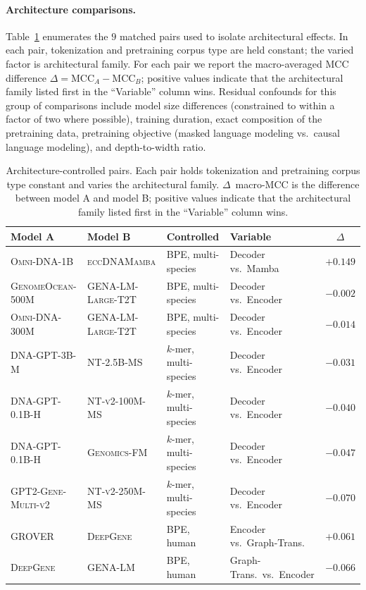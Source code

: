 \documentclass{llmxive}
\begin{document}
\paragraph{Architecture comparisons.}
Table~\ref{tab:pairs_arch} enumerates the $9$ matched pairs used to
isolate architectural effects. In each pair, tokenization and
pretraining corpus type are held constant; the varied factor is
architectural family. For each pair we report the macro-averaged MCC
difference $\Delta = \text{MCC}_A - \text{MCC}_B$; positive values
indicate that the architectural family listed first in the ``Variable''
column wins. Residual confounds for this group of comparisons include
model size differences (constrained to within a factor of two where
possible), training duration, exact composition of the pretraining
data, pretraining objective (masked language modeling vs.\ causal
language modeling), and depth-to-width ratio.


\begin{table}[!htbp]
\centering
\small
\begin{tabular}{@{}llllc@{}}
\toprule
\textbf{Model A} & \textbf{Model B} & \textbf{Controlled} & \textbf{Variable} & \textbf{$\Delta$} \\
\midrule
\textsc{Omni-DNA-1B}        & \textsc{eccDNAMamba}       & BPE, multi-species     & Decoder vs.\ Mamba         & $+0.149$ \\
\textsc{GenomeOcean-500M}   & \textsc{GENA-LM-Large-T2T} & BPE, multi-species     & Decoder vs.\ Encoder       & $-0.002$ \\
\textsc{Omni-DNA-300M}      & \textsc{GENA-LM-Large-T2T} & BPE, multi-species     & Decoder vs.\ Encoder       & $-0.014$ \\
\textsc{DNA-GPT-3B-M}       & \textsc{NT-2.5B-MS}        & $k$-mer, multi-species & Decoder vs.\ Encoder       & $-0.031$ \\
\textsc{DNA-GPT-0.1B-H}     & \textsc{NT-v2-100M-MS}     & $k$-mer, multi-species & Decoder vs.\ Encoder       & $-0.040$ \\
\textsc{DNA-GPT-0.1B-H}     & \textsc{Genomics-FM}       & $k$-mer, multi-species & Decoder vs.\ Encoder       & $-0.047$ \\
\textsc{GPT2-Gene-Multi-v2} & \textsc{NT-v2-250M-MS}     & $k$-mer, multi-species & Decoder vs.\ Encoder       & $-0.070$ \\
\textsc{GROVER}             & \textsc{DeepGene}          & BPE, human             & Encoder vs.\ Graph-Trans.  & $+0.061$ \\
\textsc{DeepGene}           & \textsc{GENA-LM}           & BPE, human             & Graph-Trans.\ vs.\ Encoder & $-0.066$ \\
\bottomrule
\end{tabular}
\caption{Architecture-controlled pairs. Each pair holds tokenization
and pretraining corpus type constant and varies the architectural
family. $\Delta$~macro-MCC is the difference between model A and
model B; positive values indicate that the architectural family
listed first in the ``Variable'' column wins.}
\label{tab:pairs_arch}
\end{table}
\end{document}
